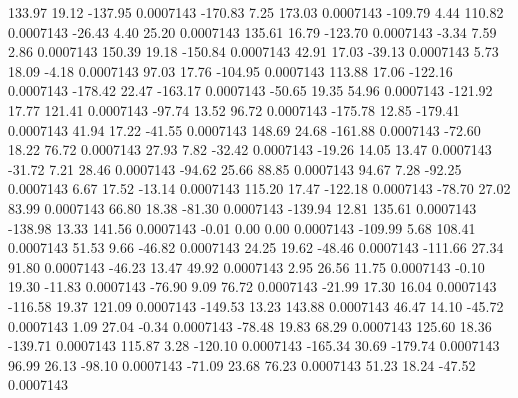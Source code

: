       133.97       19.12     -137.95     0.0007143
     -170.83        7.25      173.03     0.0007143
     -109.79        4.44      110.82     0.0007143
      -26.43        4.40       25.20     0.0007143
      135.61       16.79     -123.70     0.0007143
       -3.34        7.59        2.86     0.0007143
      150.39       19.18     -150.84     0.0007143
       42.91       17.03      -39.13     0.0007143
        5.73       18.09       -4.18     0.0007143
       97.03       17.76     -104.95     0.0007143
      113.88       17.06     -122.16     0.0007143
     -178.42       22.47     -163.17     0.0007143
      -50.65       19.35       54.96     0.0007143
     -121.92       17.77      121.41     0.0007143
      -97.74       13.52       96.72     0.0007143
     -175.78       12.85     -179.41     0.0007143
       41.94       17.22      -41.55     0.0007143
      148.69       24.68     -161.88     0.0007143
      -72.60       18.22       76.72     0.0007143
       27.93        7.82      -32.42     0.0007143
      -19.26       14.05       13.47     0.0007143
      -31.72        7.21       28.46     0.0007143
      -94.62       25.66       88.85     0.0007143
       94.67        7.28      -92.25     0.0007143
        6.67       17.52      -13.14     0.0007143
      115.20       17.47     -122.18     0.0007143
      -78.70       27.02       83.99     0.0007143
       66.80       18.38      -81.30     0.0007143
     -139.94       12.81      135.61     0.0007143
     -138.98       13.33      141.56     0.0007143
       -0.01        0.00        0.00     0.0007143
     -109.99        5.68      108.41     0.0007143
       51.53        9.66      -46.82     0.0007143
       24.25       19.62      -48.46     0.0007143
     -111.66       27.34       91.80     0.0007143
      -46.23       13.47       49.92     0.0007143
        2.95       26.56       11.75     0.0007143
       -0.10       19.30      -11.83     0.0007143
      -76.90        9.09       76.72     0.0007143
      -21.99       17.30       16.04     0.0007143
     -116.58       19.37      121.09     0.0007143
     -149.53       13.23      143.88     0.0007143
       46.47       14.10      -45.72     0.0007143
        1.09       27.04       -0.34     0.0007143
      -78.48       19.83       68.29     0.0007143
      125.60       18.36     -139.71     0.0007143
      115.87        3.28     -120.10     0.0007143
     -165.34       30.69     -179.74     0.0007143
       96.99       26.13      -98.10     0.0007143
      -71.09       23.68       76.23     0.0007143
       51.23       18.24      -47.52     0.0007143
